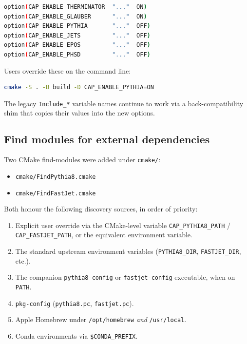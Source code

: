 \documentclass[11pt,a4paper]{article}
\begin{document}
\begin{lstlisting}[language=bash]
option(CAP_ENABLE_THERMINATOR  "..."  ON)
option(CAP_ENABLE_GLAUBER      "..."  ON)
option(CAP_ENABLE_PYTHIA       "..."  OFF)
option(CAP_ENABLE_JETS         "..."  OFF)
option(CAP_ENABLE_EPOS         "..."  OFF)
option(CAP_ENABLE_PHSD         "..."  OFF)
\end{lstlisting}

\noindent
Users override these on the command line:
\begin{lstlisting}[language=bash]
cmake -S . -B build -D CAP_ENABLE_PYTHIA=ON
\end{lstlisting}

\noindent
The legacy \texttt{Include\_*} variable names continue to work via a
back-compatibility shim that copies their values into the new options.

\subsection{Find modules for external dependencies}

Two CMake find-modules were added under \texttt{cmake/}:

\begin{itemize}
  \item \texttt{cmake/FindPythia8.cmake}
  \item \texttt{cmake/FindFastJet.cmake}
\end{itemize}

\noindent
Both honour the following discovery sources, in order of priority:

\begin{enumerate}[leftmargin=2em,itemsep=0pt]
  \item Explicit user override via the CMake-level variable
        \verb|CAP_PYTHIA8_PATH| / \verb|CAP_FASTJET_PATH|, or the equivalent
        environment variable.
  \item The standard upstream environment variables (\verb|PYTHIA8_DIR|,
        \verb|FASTJET_DIR|, etc.).
  \item The companion \texttt{pythia8-config} or \texttt{fastjet-config}
        executable, when on \texttt{PATH}.
  \item \texttt{pkg-config} (\texttt{pythia8.pc}, \texttt{fastjet.pc}).
  \item Apple Homebrew under \texttt{/opt/homebrew} \emph{and} \texttt{/usr/local}.
  \item Conda environments via \verb|$CONDA_PREFIX|.
\end{enumerate}
\end{document}
